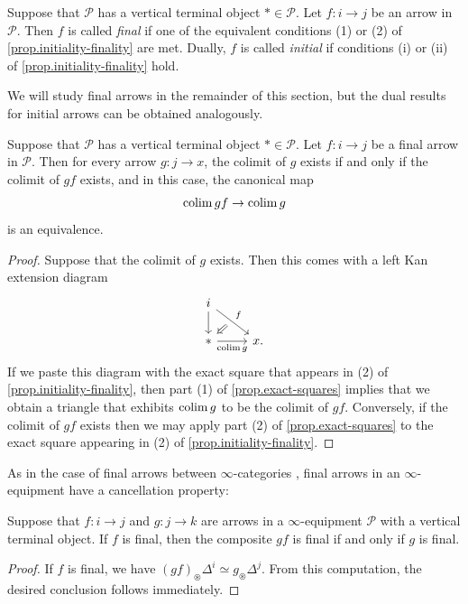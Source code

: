 \documentclass[a4paper, 11pt]{amsart}
\numberwithin{theorem}{section}
\theoremstyle{definition}
\def\colim{\qopname\relax m{colim}}
\renewcommand{\P}{\mathscr{P}}
\begin{document}
\begin{definition}\label{def.initiality-finality}
	Suppose that $\P$ has a vertical terminal object $\ast \in \P$. Let $f : i \rightarrow j$ be an arrow in $\P$.
	Then $f$ is called \textit{final} if one of the equivalent conditions (1) or (2) of \cref{prop.initiality-finality} are met. Dually, 
	$f$ is called \textit{initial} if conditions (i) or (ii) of \cref{prop.initiality-finality} hold.
\end{definition}

We will study final arrows in the remainder of this section, but the dual results for initial arrows can be obtained analogously.

\begin{proposition}
	Suppose that $\P$ has a vertical terminal object $\ast \in \P$. Let $f : i \to j$ be a final arrow in $\P$.
	Then for every arrow $g :j \to x$, the colimit of $g$ exists if and only if the  colimit of $gf$ exists, and in this case, the 
		canonical map 
		$$
		\colim gf \rightarrow \colim g
		$$
		is an equivalence.
\end{proposition}
\begin{proof}
	Suppose that the colimit of $g$ exists. Then this comes with a left Kan extension diagram
	\[
		\begin{tikzcd}
			i \arrow[dr, "f"name=f]\arrow[d] \\
			|[alias=t]|\ast \arrow[r, "\colim g"'] & x.
			\arrow[from=f,to=t,Rightarrow,shorten <= 6pt]
		\end{tikzcd}
	\]
	If we paste this diagram with the exact square that appears in (2) of \cref{prop.initiality-finality}, 
	then part (1) of \cref{prop.exact-squares} implies that we obtain a triangle that exhibits $\colim g$ to be the colimit of $gf$.
	Conversely, if the colimit of $gf$ exists then we may apply part (2) of 
	\cref{prop.exact-squares} to the exact square appearing in (2) of \cref{prop.initiality-finality}.
\end{proof}


As in the case of final arrows between $\infty$-categories \cite[Proposition 4.1.1.3]{HTT}, 
final arrows in an $\infty$-equipment have a cancellation property:

\begin{proposition}
	Suppose that $f : i \rightarrow j$ and $g : j \rightarrow k$ are arrows in a $\infty$-equipment $\P$ with a vertical terminal object.
	If $f$ is final, then the composite $gf$ is final if and only if $g$ is final.
\end{proposition}
\begin{proof}
	If $f$ is final, we have
	$
	(gf)_\circledast \Delta^i \simeq g_\circledast \Delta^j.
	$
	From this computation, the desired conclusion follows immediately.
\end{proof}
\end{document}
